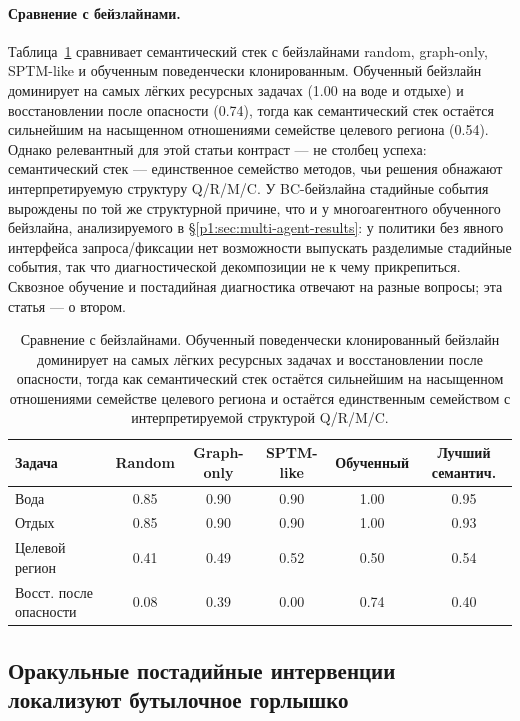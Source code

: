 \documentclass{article}
\begin{document}
\paragraph{Сравнение с бейзлайнами.}
Таблица~\ref{p1:tab:baselines} сравнивает семантический стек с бейзлайнами random,
graph-only, SPTM-like и обученным поведенчески клонированным. Обученный
бейзлайн доминирует на самых лёгких ресурсных задачах (1.00 на воде
и отдыхе) и восстановлении после опасности (0.74), тогда как семантический стек остаётся
сильнейшим на насыщенном отношениями семействе целевого региона (0.54).
Однако релевантный для этой статьи контраст --- не столбец успеха:
семантический стек --- единственное семейство методов, чьи решения обнажают
интерпретируемую структуру Q/R/M/C. У BC-бейзлайна стадийные события
вырождены по той же структурной причине, что и у многоагентного
обученного бейзлайна, анализируемого в \S\ref{p1:sec:multi-agent-results}: у
политики без явного интерфейса запроса/фиксации нет возможности выпускать разделимые
стадийные события, так что диагностической декомпозиции не к чему
прикрепиться. Сквозное обучение и постадийная диагностика отвечают на разные
вопросы; эта статья --- о втором.

\begin{table}[t]
  \caption{Сравнение с бейзлайнами. Обученный поведенчески клонированный бейзлайн доминирует на самых лёгких ресурсных задачах и восстановлении после опасности, тогда как семантический стек остаётся сильнейшим на насыщенном отношениями семействе целевого региона и остаётся единственным семейством с интерпретируемой структурой Q/R/M/C.}
  \label{p1:tab:baselines}
  \centering
  \small
  \begin{tabular}{p{1.9cm}c c c c c}
    \toprule
    Задача & Random & Graph-only & SPTM-like & Обученный & Лучший семантич. \\
    \midrule
    Вода & 0.85 & 0.90 & 0.90 & 1.00 & 0.95 \\
    Отдых & 0.85 & 0.90 & 0.90 & 1.00 & 0.93 \\
    Целевой регион & 0.41 & 0.49 & 0.52 & 0.50 & 0.54 \\
    Восст. после опасности & 0.08 & 0.39 & 0.00 & 0.74 & 0.40 \\
    \bottomrule
  \end{tabular}
\end{table}

\subsection{Оракульные постадийные интервенции локализуют бутылочное горлышко}
\label{p1:sec:oracle}
\end{document}
